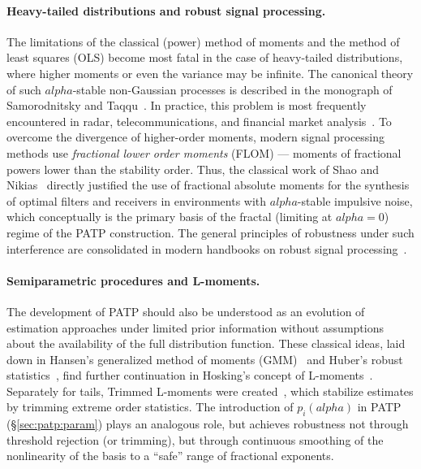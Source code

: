 \documentclass[11pt]{article}
\def\alpha{alpha}%
\theoremstyle{definition}
\begin{document}
\paragraph{Heavy-tailed distributions and robust signal processing.}
The limitations of the classical (power) method of moments and the method of
least squares (OLS) become most fatal in the case of heavy-tailed
distributions, where higher moments or even the variance may be infinite. The
canonical theory of such $\alpha$-stable non-Gaussian processes is described
in the monograph of Samorodnitsky and Taqqu~\citep{samorodnitsky1994stable}.
In practice, this problem is most frequently encountered in radar, telecommunications,
and financial market analysis~\citep{nolan2020stable, matsui2013fracmoments}.
To overcome the divergence of higher-order moments, modern signal processing
methods use \emph{fractional lower order moments} (FLOM) --- moments of
fractional powers lower than the stability order. Thus, the classical work of
Shao and Nikias~\citep{shao1993signal} directly justified the use of
fractional absolute moments for the synthesis of optimal filters and receivers
in environments with $\alpha$-stable impulsive noise, which conceptually is
the primary basis of the fractal (limiting at $\alpha = 0$) regime of the
PATP construction. The general principles of robustness under such
interference are consolidated in modern handbooks on robust signal
processing~\citep{zoubir2012robust}.

\paragraph{Semiparametric procedures and L-moments.}
The development of PATP should also be understood as an evolution of
estimation approaches under limited prior information without assumptions
about the availability of the full distribution function. These classical
ideas, laid down in Hansen's generalized method of moments
(GMM)~\citep{hansen1982gmm} and Huber's robust statistics~\citep{huber1981robust},
find further continuation in Hosking's concept of
L-moments~\citep{hosking1990lmoments}. Separately for tails, Trimmed
L-moments were created~\citep{elamir2003trimmed}, which stabilize estimates
by trimming extreme order statistics. The introduction of $p_i(\alpha)$ in
PATP (\S\ref{sec:patp:param}) plays an analogous role, but achieves
robustness not through threshold rejection (or trimming), but through
continuous smoothing of the nonlinearity of the basis to a ``safe'' range of
fractional exponents.
\end{document}
